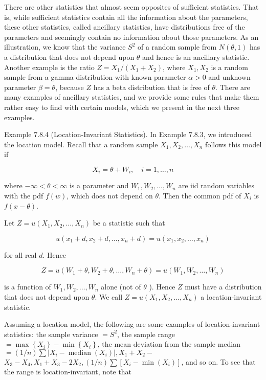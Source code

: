 There are other statistics that almost seem opposites of sufficient statistics. That is, while sufficient statistics contain all the information about the parameters, these other statistics, called ancillary statistics, have distributions free of the parameters and seemingly contain no information about those parameters. As an illustration, we know that the variance $S^{2}$ of a random sample from $N(\theta, 1)$ has a distribution that does not depend upon $\theta$ and hence is an ancillary statistic. Another example is the ratio $Z=X_{1} /\left(X_{1}+X_{2}\right)$, where $X_{1}, X_{2}$ is a random sample from a gamma distribution with known parameter $\alpha>0$ and unknown parameter $\beta=\theta$, because $Z$ has a beta distribution that is free of $\theta$. There are many examples of ancillary statistics, and we provide some rules that make them rather easy to find with certain models, which we present in the next three examples.

Example 7.8.4 (Location-Invariant Statistics). In Example 7.8.3, we introduced the location model. Recall that a random sample $X_{1}, X_{2}, \ldots, X_{n}$ follows this model if


\begin{equation*}
X_{i}=\theta+W_{i}, \quad i=1, \ldots, n \tag{7.8.3}
\end{equation*}


where $-\infty<\theta<\infty$ is a parameter and $W_{1}, W_{2}, \ldots, W_{n}$ are iid random variables with the pdf $f(w)$, which does not depend on $\theta$. Then the common pdf of $X_{i}$ is $f(x-\theta)$.

Let $Z=u\left(X_{1}, X_{2}, \ldots, X_{n}\right)$ be a statistic such that

$$
u\left(x_{1}+d, x_{2}+d, \ldots, x_{n}+d\right)=u\left(x_{1}, x_{2}, \ldots, x_{n}\right)
$$

for all real $d$. Hence

$$
Z=u\left(W_{1}+\theta, W_{2}+\theta, \ldots, W_{n}+\theta\right)=u\left(W_{1}, W_{2}, \ldots, W_{n}\right)
$$

is a function of $W_{1}, W_{2}, \ldots, W_{n}$ alone (not of $\theta$ ). Hence $Z$ must have a distribution that does not depend upon $\theta$. We call $Z=u\left(X_{1}, X_{2}, \ldots, X_{n}\right)$ a location-invariant statistic.

Assuming a location model, the following are some examples of location-invariant statistics: the sample variance $=S^{2}$, the sample range $=\max \left\{X_{i}\right\}-\min \left\{X_{i}\right\}$, the mean deviation from the sample median $=(1 / n) \sum\left|X_{i}-\operatorname{median}\left(X_{i}\right)\right|, X_{1}+X_{2}-$ $X_{3}-X_{4}, X_{1}+X_{3}-2 X_{2},(1 / n) \sum\left[X_{i}-\min \left(X_{i}\right)\right]$, and so on. To see that the range is location-invariant, note that

